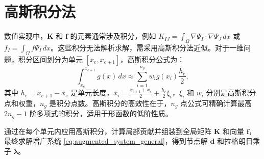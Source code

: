 \documentclass[engineeringmaster]{hquThesis}
\begin{document}

\section{高斯积分法}
数值实现中，\( \boldsymbol{K} \) 和 \( \boldsymbol{f} \) 的元素通常涉及积分，例如 \( K_{IJ} = \int_{\Omega} \nabla \Psi_I \cdot \nabla \Psi_J \, dx \) 或 \( f_I = \int_{\Omega} f \Psi_I \, dx \)。这些积分无法解析求解，需采用高斯积分法近似。对于一维问题，积分区间划分为单元 \( [x_e, x_{e+1}] \)，高斯积分公式为：
\begin{equation}
\int_{x_e}^{x_{e+1}} g(x) \, dx \approx \sum_{i=1}^{n_g} w_i g(x_i) \frac{h_e}{2},
\label{eq:gauss_quadrature}
\end{equation}
其中 \( h_e = x_{e+1} - x_e \) 是单元长度，\( x_i = \frac{x_{e+1} + x_e}{2} + \frac{h_e}{2} \xi_i \)，\( \xi_i \) 和 \( w_i \) 分别是高斯积分点和权重，\( n_g \) 是积分点数。高斯积分的高效性在于，\( n_g \) 点公式可精确计算最高 \( 2n_g - 1 \) 阶多项式的积分，适用于形函数的低阶性质。

通过在每个单元内应用高斯积分，计算局部贡献并组装到全局矩阵 \( \boldsymbol{K} \) 和向量 \( \boldsymbol{f} \)，最终求解增广系统 \eqref{eq:augmented_system_general}，得到节点解 \( \boldsymbol{d} \) 和拉格朗日乘子 \( \boldsymbol{\lambda} \)。
\end{document}
